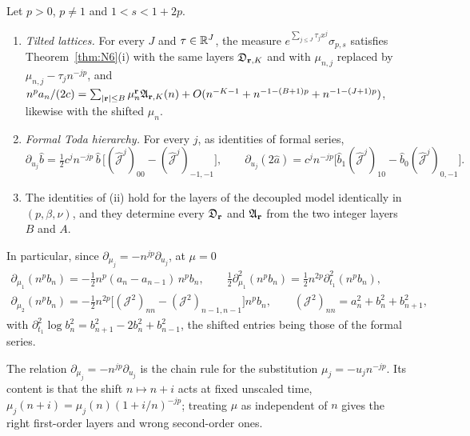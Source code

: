 \begin{theorem}\label{thm:toda}
Let $p>0$, $p\ne1$ and $1<s<1+2p$.
\begin{enumerate}
\item[(i)] \emph{Tilted lattices.} For every $J$ and $\tau\in\mathbb{R}^J$, the measure $e^{\sum_{j\le J}\tau_jx^j}\sigma_{p,s}$ satisfies
Theorem~\ref{thm:N6}(i) with the same layers $\mathfrak D_{\mathbf r,K}$ and with $\mu_{n,j}$ replaced by $\mu_{n,j}-\tau_jn^{-jp}$, and
$n^pa_n/(2c)=\sum_{|\mathbf r|\le B}\mu_n^{\mathbf r}\mathfrak A_{\mathbf r,K}(n)+O(n^{-K-1}+n^{-1-(B+1)p}+n^{-1-(J+1)p})$, likewise with the shifted $\mu_n$.
\item[(ii)] \emph{Formal Toda hierarchy.} For every $j$, as identities of formal series,
\[
  \partial_{u_j}\hat b=\tfrac12c^jn^{-jp}\,\hat b\,\bigl[(\hat{\mathcal J}^j)_{00}-(\hat{\mathcal J}^j)_{-1,-1}\bigr],\qquad
  \partial_{u_j}(2\hat a)=c^jn^{-jp}\bigl[\hat b_1(\hat{\mathcal J}^j)_{10}-\hat b_0(\hat{\mathcal J}^j)_{0,-1}\bigr].
\]
\item[(iii)] The identities of (ii) hold for the layers of the decoupled model identically in $(p,\beta,\nu)$, and they determine every
$\mathfrak D_{\mathbf r}$ and $\mathfrak A_{\mathbf r}$ from the two integer layers $B$ and $A$.
\end{enumerate}
In particular, since $\partial_{\mu_j}=-n^{jp}\partial_{u_j}$, at $\mu=0$
\begin{gather*}
  \partial_{\mu_1}(n^pb_n)=-\tfrac12n^p(a_n-a_{n-1})\,n^pb_n,\qquad
  \tfrac12\partial_{\mu_1}^2(n^pb_n)=\tfrac12n^{2p}\partial_{t_1}^2(n^pb_n),\\
  \partial_{\mu_2}(n^pb_n)=-\tfrac12n^{2p}\bigl[(\mathcal J^2)_{nn}-(\mathcal J^2)_{n-1,n-1}\bigr]n^pb_n,\qquad
  (\mathcal J^2)_{nn}=a_n^2+b_n^2+b_{n+1}^2,
\end{gather*}
with $\partial_{t_1}^2\log b_n^2=b_{n+1}^2-2b_n^2+b_{n-1}^2$, the shifted entries being those of the formal series.
\end{theorem}

The relation $\partial_{\mu_j}=-n^{jp}\partial_{u_j}$ is the chain rule for the substitution $\mu_j=-u_jn^{-jp}$. Its content is that the
shift $n\mapsto n+i$ acts at fixed unscaled time, $\mu_j(n+i)=\mu_j(n)(1+i/n)^{-jp}$; treating $\mu$ as independent of $n$ gives the
right first-order layers and wrong second-order ones.

